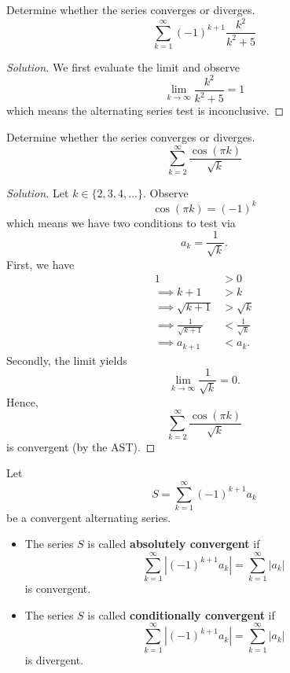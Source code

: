 \documentclass[compacto,10pt,comentarios]{aleph-notas}
\begin{document}
\begin{ejer}
    Determine whether the series converges or diverges.
    $$
        \sum_{k=1}^{\infty} (-1)^{k+1} \frac{k^2}{k^2 + 5}
    $$
\end{ejer}
\begin{proof}[Solution]
    We first evaluate the limit and observe
    $$
        \lim_{k \to \infty} \frac{k^2}{k^2 + 5} = 1
    $$
    which means the alternating series test is inconclusive.
\end{proof}

\begin{ejer}
    Determine whether the series converges or diverges.
    $$
        \sum_{k=2}^{\infty} \frac{\cos(\pi k)}{\sqrt{k}}
    $$
\end{ejer}
\begin{proof}[Solution]
    Let $k \in \{2, 3, 4, \ldots \}$. Observe
    $$
        \cos(\pi k) = (-1)^{k}
    $$
    which means we have two conditions to test via
    $$
        a_k = \frac{1}{\sqrt{k}}.
    $$
    First, we have
    \begin{align*}
        1 & > 0 \\
        \implies k + 1 & > k \\
        \implies \sqrt{k+1} & > \sqrt{k} \\
        \implies \frac{1}{\sqrt{k+1}} & < \frac{1}{\sqrt{k}} \\
        \implies a_{k+1} & < a_{k}.
    \end{align*}
    Secondly, the limit yields
    $$
        \lim_{k \to \infty} \frac{1}{\sqrt{k}} = 0.
    $$
    Hence, 
    $$
        \sum_{k=2}^{\infty} \frac{\cos(\pi k)}{\sqrt{k}}
    $$
    is convergent (by the AST).
\end{proof}

\begin{defi}
    Let
    $$
        S = \sum_{k=1}^{\infty} (-1)^{k + 1} a_k
    $$
    be a convergent alternating series.
    \begin{itemize}
        \item The series $S$ is called \textbf{absolutely convergent} if
        $$
            \sum_{k=1}^{\infty} |(-1)^{k + 1} a_k| = \sum_{k=1}^{\infty} |a_k|
        $$
        is convergent.
        \item The series $S$ is called \textbf{conditionally convergent} if
        $$
            \sum_{k=1}^{\infty} |(-1)^{k + 1} a_k| = \sum_{k=1}^{\infty} |a_k|
        $$
        is divergent.
    \end{itemize}
\end{defi}
\end{document}
